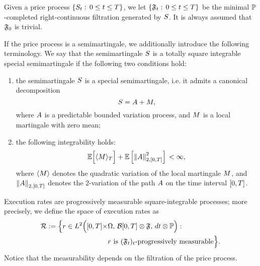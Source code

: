 \documentclass[10pt,a4paper]{article}
\begin{document}
Given a price process  $\lbrace \fundamentalPrice_t:\, 0\leq t\leq T\rbrace$, we let $\lbrace \sigmaAlgebra_t: \, 0\leq t\leq T\rbrace$ be the minimal $\Prob$-completed right-continuous filtration generated by $\fundamentalPrice$. It is always assumed that $\sigmaAlgebra_0$ is trivial. 

If the price process is a semimartingale, we additionally introduce the following terminology. We say that the semimartingale $\semimartingale$ is a totally square integrable special semimartingale if the following two conditions hold:
\begin{enumerate}
\item the semimartingale $\semimartingale$ is a special semimartingale, i.e. it admits a canonical decomposition 
\begin{equation*}
\semimartingale=\boundedVariationPart + \martingale,
\end{equation*}
where $\boundedVariationPart$ is a predictable bounded variation process, and $\martingale$ is a local martingale with zero mean;
\item the following integrability holds:
\begin{equation*}
\Expectation \Big[ \langle \martingale \rangle_\timeHorizon  \Big] + \Expectation \left[ \norm[\boundedVariationPart]_{2,\timeWindow}\squared  \right] \, < \infty,
\end{equation*}
where $\langle \martingale \rangle$ denotes the quadratic variation of the local martingale $\martingale$, and $ \norm[\boundedVariationPart]_{2,\timeWindow}$ denotes the $2$-variation of the path $\boundedVariationPart$ on the time interval $\timeWindow$. 
\end{enumerate}



Execution rates are progressively measurable square-integrable processes; more precisely, we define the space of execution rates as
\begin{equation}\label{eq.definitionOfSpaceExecutionRates}
\begin{split}
\spaceExecutionRates:= \Big\lbrace
r \in \Ltwo\Big([0,T]\times& \Omega, \, \mathcal{B}[0,T]\otimes \sigmaAlgebra, \, dt\otimes \Prob\Big): \, \\
&
r \text{ is } (\sigmaAlgebra_t)_t\text{-progressively measurable}\Big\rbrace.
\end{split}
\end{equation}
Notice that the measurability depends on the filtration of the price process. 
\end{document}
